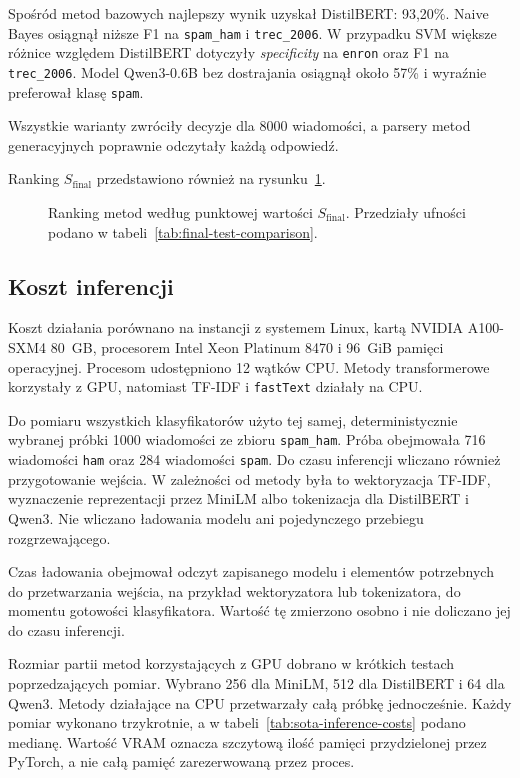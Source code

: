 Spośród metod bazowych najlepszy wynik uzyskał DistilBERT: 93,20\%. Naive Bayes
osiągnął niższe F1 na \texttt{spam\_ham} i \texttt{trec\_2006}. W przypadku SVM
większe różnice względem DistilBERT dotyczyły \emph{specificity} na \texttt{enron} oraz F1 na
\texttt{trec\_2006}.
Model Qwen3-0.6B bez dostrajania osiągnął około 57\% i wyraźnie preferował klasę
\texttt{spam}.

Wszystkie warianty zwróciły decyzje dla 8000 wiadomości, a parsery metod
generacyjnych poprawnie odczytały każdą odpowiedź.

Ranking \(S_{\mathrm{final}}\) przedstawiono również na
rysunku~\ref{fig:final-test-score-ranking}.

\begin{figure}[htbp]
\centering

\caption{Ranking metod według punktowej wartości \(S_{\mathrm{final}}\).
Przedziały ufności podano w tabeli~\ref{tab:final-test-comparison}.}
\label{fig:final-test-score-ranking}
\end{figure}

\subsection{Koszt inferencji}

Koszt działania porównano na instancji z systemem Linux, kartą NVIDIA
A100-SXM4 80~GB, procesorem Intel Xeon Platinum 8470 i 96~GiB pamięci
operacyjnej. Procesom udostępniono 12 wątków CPU. Metody transformerowe
korzystały z GPU, natomiast TF-IDF i \texttt{fastText} działały na CPU.

Do pomiaru wszystkich klasyfikatorów użyto tej samej, deterministycznie wybranej
próbki 1000 wiadomości ze zbioru \texttt{spam\_ham}. Próba obejmowała 716
wiadomości \texttt{ham} oraz 284 wiadomości \texttt{spam}. Do czasu inferencji
wliczano również przygotowanie wejścia. W zależności od metody była to
wektoryzacja TF-IDF, wyznaczenie reprezentacji przez MiniLM albo tokenizacja dla
DistilBERT i Qwen3. Nie wliczano ładowania modelu ani pojedynczego przebiegu
rozgrzewającego.

Czas ładowania obejmował odczyt zapisanego modelu i elementów potrzebnych do
przetwarzania wejścia, na przykład wektoryzatora lub tokenizatora, do momentu
gotowości klasyfikatora. Wartość tę zmierzono osobno i nie doliczano jej do
czasu inferencji.

Rozmiar partii metod korzystających z GPU dobrano w krótkich testach
poprzedzających pomiar. Wybrano 256 dla MiniLM, 512 dla DistilBERT i 64 dla
Qwen3. Metody działające na CPU przetwarzały całą próbkę jednocześnie. Każdy
pomiar wykonano trzykrotnie, a w tabeli~\ref{tab:sota-inference-costs} podano
medianę. Wartość VRAM oznacza szczytową ilość pamięci przydzielonej przez
PyTorch, a nie całą pamięć zarezerwowaną przez proces.

